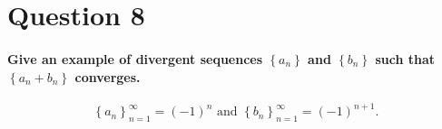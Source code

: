 \section*{Question 8}%
\paragraph{Give an example of divergent sequences $ \left\{ a_n \right\}  $ and $ \left\{ b_n \right\}  $ such that $ \left\{ a_n + b_n \right\}  $ converges. }
\[
\left\{ a_n \right\} _{ n=1 }^{ \infty }=\left( -1 \right) ^{ n }\text{ and }\left\{ b_n \right\} _{ n=1 }^{ \infty }=\left( -1 \right) ^{ n+1 }
.\] 


